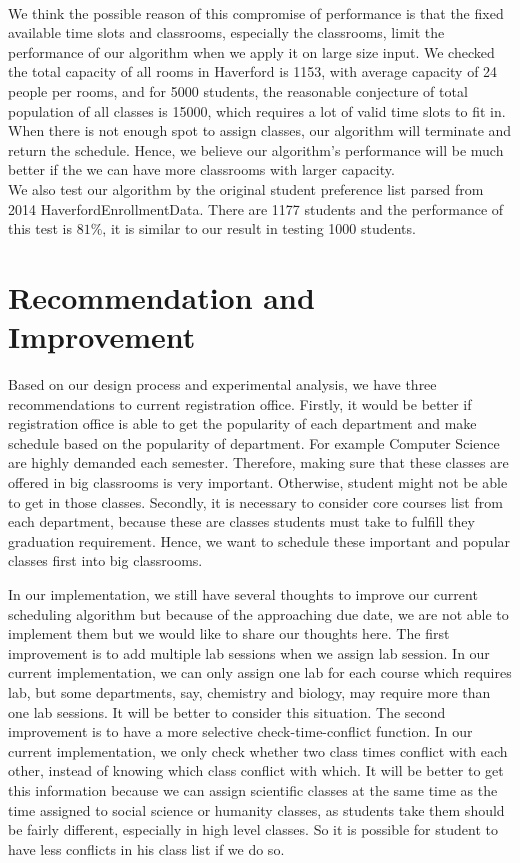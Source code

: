 \documentclass[11pt, oneside]{article}   	%
\begin{document}
\\We think the possible reason of this compromise of performance is that the fixed available time slots and classrooms, especially the classrooms, limit the performance of our algorithm when we apply it on large size input. We checked the total capacity of all rooms in Haverford is 1153, with average capacity of 24 people per rooms, and for 5000 students, the reasonable conjecture of total population of all classes is 15000, which requires a lot of valid time slots to fit in. When there is not enough spot to assign classes, our algorithm will terminate and return the schedule. Hence, we believe our algorithm's performance will be much better if the we can have more classrooms with larger capacity. 
\\We also test our algorithm by the original student preference list parsed from 2014 HaverfordEnrollmentData. There are 1177 students and the performance of this test is $81\%$, it is similar to our result in testing 1000 students. 

\section{Recommendation and Improvement}
Based on our design process and experimental analysis, we have three recommendations to current registration office. Firstly, it would be better if registration office is able to get the popularity of each department and make schedule based on the popularity of department. For example Computer Science are highly demanded each semester. Therefore, making sure that these classes are offered in big classrooms is very important. Otherwise, student might not be able to get in those classes. Secondly, it is necessary to consider core courses list from each department, because these are classes students must take to fulfill they graduation requirement. Hence, we want to schedule these important and popular classes first into big classrooms. 
\par In our implementation, we still have several thoughts to improve our current scheduling algorithm but because of the approaching due date, we are not able to implement them but we would like to share our thoughts here. The first improvement is to add multiple lab sessions when we assign lab session. In our current implementation, we can only assign one lab for each course which requires lab, but some departments, say, chemistry and biology, may require more than one lab sessions. It will be better to consider this situation. The second improvement is to have a more selective check-time-conflict function. In our current implementation, we only check whether two class times conflict with each other, instead of knowing which class conflict with which. It will be better to get this information because we can assign scientific classes at the same time as the time assigned to social science or humanity classes, as students take them should be fairly different, especially in high level classes. So it is possible for student to have less conflicts in his class list if we do so. 
\end{document}
